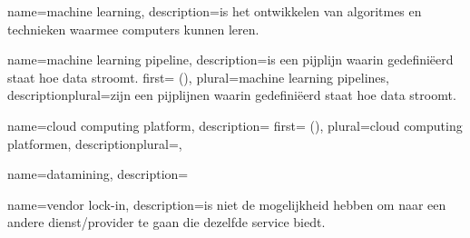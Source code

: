 {
    name=machine learning,
    description={is het ontwikkelen van algoritmes en technieken waarmee computers kunnen leren.}
}

{
    name=machine learning pipeline,
    description={is een pijplijn waarin gedefiniëerd staat hoe data stroomt.}
    first={ ()},
    plural={machine learning pipelines},
    descriptionplural={zijn een pijplijnen waarin gedefiniëerd staat hoe data stroomt.}   
}

{
    name=cloud computing platform,
    description={}
    first={ ()},
    plural={cloud computing platformen},
    descriptionplural={},
}

{
    name=datamining,
    description={}
}


{
    name=vendor lock-in,
    description={is niet de mogelijkheid hebben om naar een andere dienst/provider te gaan die dezelfde service biedt.}
}

